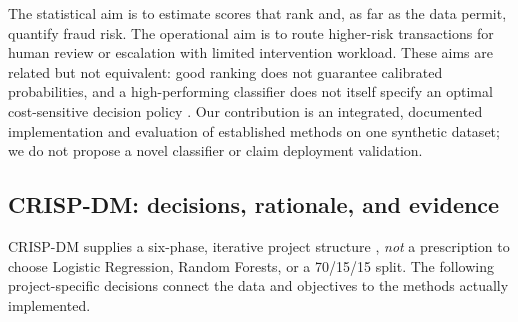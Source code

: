 \documentclass[11pt,a4paper]{article}
\begin{document}
The statistical aim is to estimate scores that rank and, as far as
the data permit, quantify fraud risk. The operational aim is to route
higher-risk transactions for human review or escalation with limited
intervention workload. These aims are related but not equivalent:
good ranking does not guarantee calibrated probabilities, and a
high-performing classifier does not itself specify an optimal
cost-sensitive decision policy \cite{gneiting2007,berger1985}.
Our contribution is an integrated, documented implementation and
evaluation of established methods on one synthetic dataset; we do
not propose a novel classifier or claim deployment validation.

\subsection{CRISP-DM: decisions, rationale, and evidence}
CRISP-DM supplies a six-phase, iterative project structure
\cite{chapman2000}, \emph{not} a prescription to choose Logistic
Regression, Random Forests, or a 70/15/15 split. The following
project-specific decisions connect the data and objectives to the
methods actually implemented.
\end{document}
